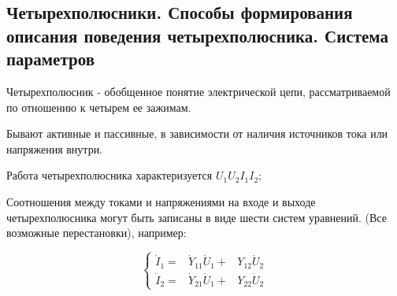 \subsection{Четырехполюсники. Способы формирования описания поведения четырехполюсника. Система параметров}


Четырехполюсник - обобщенное понятие электрической цепи, рассматриваемой по отношению к четырем ее зажимам.

Бывают активные и пассивные, в зависимости от наличия источников тока или напряжения внутри.

Работа четырехполюсника характеризуется $U_1 U_2 I_1 I_2$;

Соотношения между токами и напряжениями на входе и выходе четырехполюсника могут быть записаны в виде шести систем уравнений.
(Все возможные перестановки), например:

$$
\left\{\begin{matrix}
\dot I_1  =&\dot Y_{11} \dot U_1  + & Y_{12} \dot U_2 \\ 
\dot I_2  =&\dot Y_{21} \dot U_1  + & Y_{22} \dot U_2
\end{matrix}\right.
$$


\pagebreak